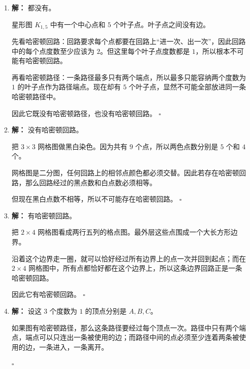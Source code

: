\documentclass[11pt,a4paper,fontset=fandol]{ctexart}
\theoremstyle{formalexample}
\newenvironment{solution}{\par\noindent\textbf{解：}}{\hfill$\square$\par}
\begin{document}
\begin{enumerate}
\begin{solution}
  在这个图里，上边中间两个点和下边中间两个点是度数 $3$ 的点，共有 $4$ 个奇度点。

  由于奇度点个数是 $4$，不等于 $0$ 或 $2$，所以不存在欧拉道路。
  \end{solution}

  \item \begin{solution}
  都没有。

  星形图 $K_{1,5}$ 中有一个中心点和 $5$ 个叶子点。叶子点之间没有边。

  先看哈密顿回路：回路要求每个点都要在回路上“进一次、出一次”，因此回路中的每个点度数至少应该为 $2$。但这里每个叶子点度数都是 $1$，所以根本不可能有哈密顿回路。

  再看哈密顿路径：一条路径最多只有两个端点，所以最多只能容纳两个度数为 $1$ 的叶子点作为路径端点。现在却有 $5$ 个叶子点，显然不可能全部放进同一条哈密顿路径中。

  因此它既没有哈密顿路径，也没有哈密顿回路。
  \end{solution}

  \item \begin{solution}
  没有哈密顿回路。

  把 $3\times 3$ 网格图做黑白染色。因为共有 $9$ 个点，所以两色点数分别是 $5$ 个和 $4$ 个。

  网格图是二分图，任何回路上的相邻点颜色都必须交替。因此若存在哈密顿回路，那么回路经过的黑点数和白点数必须相等。

  但现在黑白点数不相等，所以不可能存在哈密顿回路。
  \end{solution}

  \item \begin{solution}
  有哈密顿回路。

  把 $2\times 4$ 网格图看成两行五列的格点图。最外层这些点围成一个大长方形边界。

  沿着这个边界走一圈，就可以恰好经过所有边界上的点一次并回到起点；而在 $2\times 4$ 网格图中，所有点都恰好都在这个边界上，所以这条边界回路正是一条哈密顿回路。

  因此它有哈密顿回路。
  \end{solution}

  \item \begin{solution}
  设这 3 个度数为 $1$ 的顶点分别是 $A,B,C$。

  如果图有哈密顿路径，那么这条路径要经过每个顶点一次。路径中只有两个端点，端点可以只连出一条被使用的边；而路径中间的点必须至少连着两条被使用的边，一条进入，一条离开。


\end{solution}
\end{enumerate}
\end{document}
